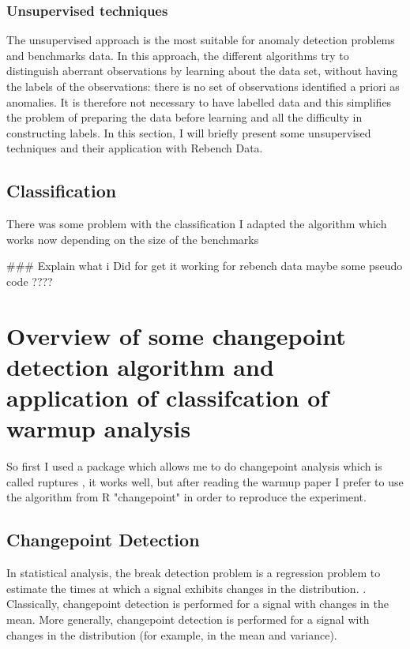 \documentclass{article}
\begin{document}
\subsubsection{Unsupervised techniques}
The unsupervised approach is the most suitable for anomaly detection problems and benchmarks data. In this approach, the different algorithms try to distinguish aberrant observations by learning about the data set, without having the labels of the observations: there is no set of observations identified a priori as anomalies. It is therefore not necessary to have labelled data and this simplifies the problem of preparing the data before learning and all the difficulty in constructing labels. In this section, I will briefly present some unsupervised techniques and their application with Rebench Data.




\subsection{Classification}

There was some problem with the classification I adapted the algorithm which works now depending on the size of the benchmarks


\#\#\# Explain what i Did for get it working for rebench data maybe some pseudo code ????

\section{Overview of some changepoint detection algorithm and application of classifcation of warmup analysis}


So first I used a package which allows me to do changepoint analysis which is called ruptures \cite{truong2020selective}, it works well, but after reading the warmup paper I prefer to use the algorithm from R "changepoint" \cite{killick2014changepoint} in order to reproduce the experiment.

\subsection{Changepoint Detection}
In statistical analysis, the break detection problem is a regression problem to estimate the times at which a signal exhibits changes in the distribution. . Classically, changepoint detection is performed for a signal with changes in the mean. More generally, changepoint detection is performed for a signal with changes in the distribution (for example, in the mean and variance). \\
\end{document}
